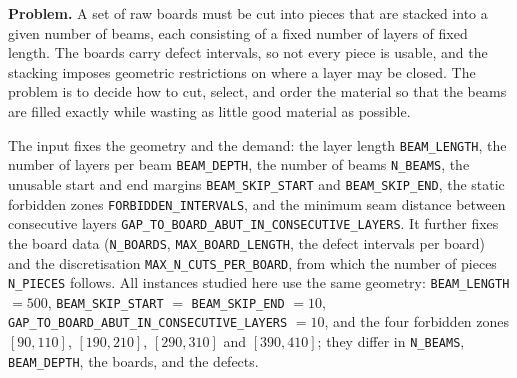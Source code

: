 \documentclass[11pt,a4paper]{article}
\begin{document}
\begin{sloppypar}
\textbf{Problem.}
A set of raw boards must be cut into pieces that are stacked into a given
number of beams, each consisting of a fixed number of layers of fixed length.
The boards carry defect intervals, so not every piece is usable, and the
stacking imposes geometric restrictions on where a layer may be closed.
The problem is to decide how to cut, select, and order the material so that
the beams are filled exactly while wasting as little good material as
possible.

The input fixes the geometry and the demand: the layer length
\texttt{BEAM\_LENGTH}, the number of layers per beam \texttt{BEAM\_DEPTH}, the
number of beams \texttt{N\_BEAMS}, the unusable start and end margins
\texttt{BEAM\_SKIP\_START} and \texttt{BEAM\_SKIP\_END}, the static forbidden
zones \texttt{FORBIDDEN\_INTERVALS}, and the minimum seam distance between
consecutive layers \texttt{GAP\_TO\_BOARD\_ABUT\_IN\_CONSECUTIVE\_LAYERS}.
It further fixes the board data (\texttt{N\_BOARDS}, \texttt{MAX\_BOARD\_LENGTH},
the defect intervals per board) and the discretisation
\texttt{MAX\_N\_CUTS\_PER\_BOARD}, from which the number of pieces
\texttt{N\_PIECES} follows.
All instances studied here use the same geometry:
\texttt{BEAM\_LENGTH} $=500$, \texttt{BEAM\_SKIP\_START} $=$
\texttt{BEAM\_SKIP\_END} $=10$, \texttt{GAP\_TO\_BOARD\_ABUT\_IN\_CONSECUTIVE\_LAYERS}
$=10$, and the four forbidden zones $[90,110]$, $[190,210]$, $[290,310]$ and
$[390,410]$; they differ in \texttt{N\_BEAMS}, \texttt{BEAM\_DEPTH}, the
boards, and the defects.


\end{sloppypar}
\end{document}
